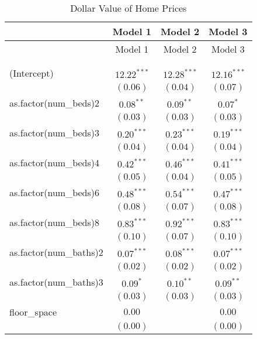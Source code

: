 
\begin{center}
\begin{longtable}{l c c c}
\hline
 & Model 1 & Model 2 & Model 3 \\
\hline
\endfirsthead
\hline
 & Model 1 & Model 2 & Model 3 \\
\hline
\endhead
\hline
\endfoot
\hline
\multicolumn{4}{l}{\scriptsize{$^{***}p<0.001$; $^{**}p<0.01$; $^{*}p<0.05$}}\\
\caption{Dollar Value of Home Prices}
\label{tab:fact.school}
\endlastfoot \\
(Intercept)                & $12.22^{***}$ & $12.28^{***}$ & $12.16^{***}$ \\
                           & $(0.06)$      & $(0.04)$      & $(0.07)$      \\
as.factor(num\_beds)2      & $0.08^{**}$   & $0.09^{**}$   & $0.07^{*}$    \\
                           & $(0.03)$      & $(0.03)$      & $(0.03)$      \\
as.factor(num\_beds)3      & $0.20^{***}$  & $0.23^{***}$  & $0.19^{***}$  \\
                           & $(0.04)$      & $(0.04)$      & $(0.04)$      \\
as.factor(num\_beds)4      & $0.42^{***}$  & $0.46^{***}$  & $0.41^{***}$  \\
                           & $(0.05)$      & $(0.04)$      & $(0.05)$      \\
as.factor(num\_beds)6      & $0.48^{***}$  & $0.54^{***}$  & $0.47^{***}$  \\
                           & $(0.08)$      & $(0.07)$      & $(0.08)$      \\
as.factor(num\_beds)8      & $0.83^{***}$  & $0.92^{***}$  & $0.83^{***}$  \\
                           & $(0.10)$      & $(0.07)$      & $(0.10)$      \\
as.factor(num\_baths)2     & $0.07^{***}$  & $0.08^{***}$  & $0.07^{***}$  \\
                           & $(0.02)$      & $(0.02)$      & $(0.02)$      \\
as.factor(num\_baths)3     & $0.09^{*}$    & $0.10^{**}$   & $0.09^{**}$   \\
                           & $(0.03)$      & $(0.03)$      & $(0.03)$      \\
floor\_space               & $0.00$        &               & $0.00$        \\
                           & $(0.00)$      &               & $(0.00)$      \\

\end{longtable}
\end{center}
